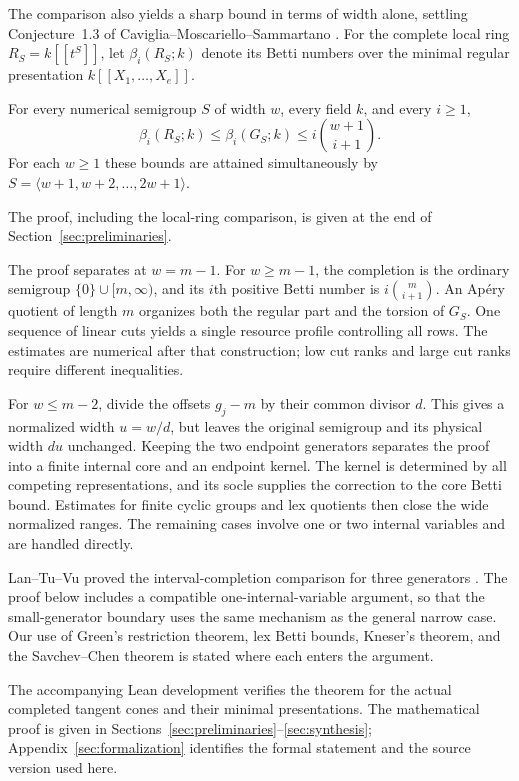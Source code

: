 The comparison also yields a sharp bound in terms of width alone,
settling Conjecture~1.3 of Caviglia--Moscariello--Sammartano
\cite{CMSBounds}. For the complete local ring
$R_S=k[[t^S]]$, let $\beta_i(R_S;k)$ denote its Betti numbers over
the minimal regular presentation $k[[X_1,\ldots,X_e]]$.
\begin{corollary}\label{cor:width-bound}
For every numerical semigroup $S$ of width $w$, every field $k$, and
every $i\ge1$,
\[
 \beta_i(R_S;k)\le\beta_i(G_S;k)
                 \le i\binom{w+1}{i+1}.
\]
For each $w\ge1$ these bounds are attained simultaneously by
$S=\langle w+1,w+2,\ldots,2w+1\rangle$.
\end{corollary}
The proof, including the local-ring comparison, is given at the end of
Section~\ref{sec:preliminaries}.

The proof separates at $w=m-1$. For $w\ge m-1$, the completion is
the ordinary semigroup $\{0\}\cup[m,\infty)$, and its $i$th positive
Betti number is $i\binom{m}{i+1}$. An Ap\'ery quotient of length $m$
organizes both the regular part and the torsion of $G_S$. One sequence
of linear cuts yields a single resource profile controlling all rows.
The estimates are numerical after that construction; low cut ranks and
large cut ranks require different inequalities.

For $w\le m-2$, divide the offsets $g_j-m$ by their common divisor
$d$. This gives a normalized width $u=w/d$, but leaves the original
semigroup and its physical width $du$ unchanged. Keeping the two endpoint
generators separates the proof into a finite internal core and an
endpoint kernel. The kernel is determined by all competing
representations, and its socle supplies the correction to the core Betti
bound. Estimates for finite cyclic groups and lex quotients then close
the wide normalized ranges. The remaining cases involve one or two
internal variables and are handled directly.

Lan--Tu--Vu proved the interval-completion comparison for three
generators \cite{LanTuVu}. The proof below includes a compatible
one-internal-variable argument, so that the small-generator boundary
uses the same mechanism as the general narrow case. Our use of Green's
restriction theorem, lex Betti bounds, Kneser's theorem, and the
Savchev--Chen theorem is stated where each enters the argument.

The accompanying Lean development verifies the theorem for the actual
completed tangent cones and their minimal presentations. The mathematical
proof is given in Sections~\ref{sec:preliminaries}--\ref{sec:synthesis};
Appendix~\ref{sec:formalization} identifies the formal statement and the
source version used here.


